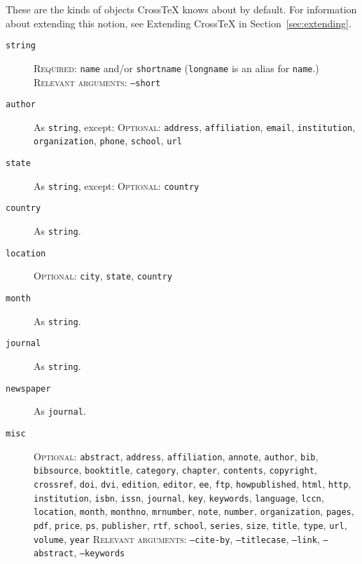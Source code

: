 \documentclass{article}
\newcommand{\XTX}{Cross\TeX}
\begin{document}
These are the kinds of objects \XTX{} knows about by default. For
information about extending this notion, see Extending \XTX{} in
Section~\ref{sec:extending}.

\begin{description}

\item[\texttt{string}]
\textsc{Required:} \texttt{name} and/or \texttt{shortname}
(\texttt{longname} is an alias for \texttt{name}.)
\textsc{Relevant arguments:} \texttt{--short}

\item[\texttt{author}] As \texttt{string}, except:
\textsc{Optional:} \texttt{address}, \texttt{affiliation}, \texttt{email},
\texttt{institution}, \texttt{organization}, \texttt{phone},
\texttt{school}, \texttt{url}

\item[\texttt{state}] As \texttt{string}, except:
\textsc{Optional:} \texttt{country}

\item[\texttt{country}] As \texttt{string}.

\item[\texttt{location}]
\textsc{Optional:} \texttt{city}, \texttt{state}, \texttt{country}

\item[\texttt{month}] As \texttt{string}.

\item[\texttt{journal}] As \texttt{string}.

\item[\texttt{newspaper}] As \texttt{journal}.

\item[\texttt{misc}]
\textsc{Optional:}
\texttt{abstract},
\texttt{address},
\texttt{affiliation},
\texttt{annote},
\texttt{author},
\texttt{bib},
\texttt{bibsource},
\texttt{booktitle},
\texttt{category},
\texttt{chapter},
\texttt{contents},
\texttt{copyright},
\texttt{crossref},
\texttt{doi},
\texttt{dvi},
\texttt{edition},
\texttt{editor},
\texttt{ee},
\texttt{ftp},
\texttt{howpublished},
\texttt{html},
\texttt{http},
\texttt{institution},
\texttt{isbn},
\texttt{issn},
\texttt{journal},
\texttt{key},
\texttt{keywords},
\texttt{language},
\texttt{lccn},
\texttt{location},
\texttt{month},
\texttt{monthno},
\texttt{mrnumber},
\texttt{note},
\texttt{number},
\texttt{organization},
\texttt{pages},
\texttt{pdf},
\texttt{price},
\texttt{ps},
\texttt{publisher},
\texttt{rtf},
\texttt{school},
\texttt{series},
\texttt{size},
\texttt{title},
\texttt{type},
\texttt{url},
\texttt{volume},
\texttt{year}
\textsc{Relevant arguments:} \texttt{--cite-by}, \texttt{--titlecase},
\texttt{--link}, \texttt{--abstract}, \texttt{--keywords}


\end{description}
\end{document}
